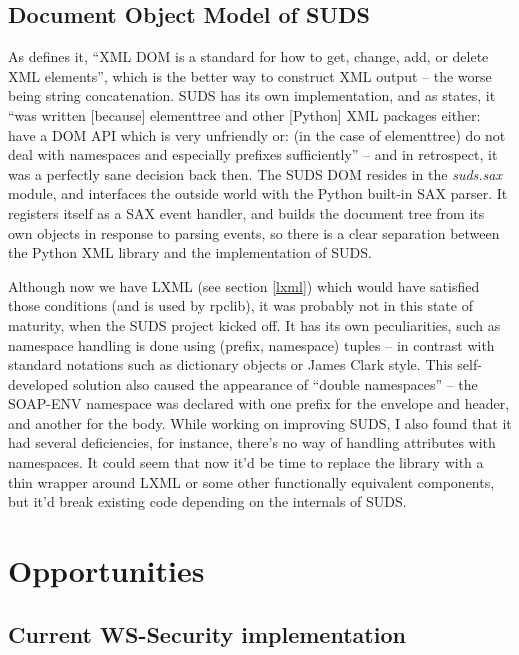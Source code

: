 \subsection{Document Object Model of SUDS}

As \cite{w3schools-domintro} defines it, ``XML DOM is a standard for how to get, change, add, or delete XML elements'', which is the better way to construct XML output -- the worse being string concatenation. SUDS has its own implementation, and as \cite{suds-doc} states, it ``was written [because] elementtree and other [Python] XML packages either: have a DOM API which is very unfriendly or: (in the case of elementtree) do not deal with namespaces and especially prefixes sufficiently'' -- and in retrospect, it was a perfectly sane decision back then. The SUDS DOM resides in the \emph{suds.sax} module, and interfaces the outside world with the Python built-in SAX parser. It registers itself as a SAX event handler, and builds the document tree from its own objects in response to parsing events, so there is a clear separation between the Python XML library and the implementation of SUDS.

Although now we have LXML (see section \ref{lxml}) which would have satisfied those conditions (and is used by rpclib), it was probably not in this state of maturity, when the SUDS project kicked off. It has its own peculiarities, such as namespace handling is done using (prefix, namespace) tuples -- in contrast with standard notations such as dictionary objects or James Clark style. This self-developed solution also caused the appearance of ``double namespaces'' -- the SOAP-ENV namespace was declared with one prefix for the envelope and header, and another for the body. While working on improving SUDS, I also found that it had several deficiencies, for instance, there's no way of handling attributes with namespaces. It could seem that now it'd be time to replace the library with a thin wrapper around LXML or some other functionally equivalent components, but it'd break existing code depending on the internals of SUDS.

\section{Opportunities}

\subsection{Current WS-Security implementation}

